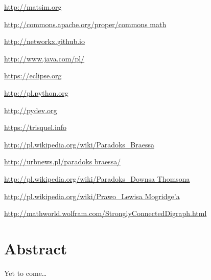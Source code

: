 \documentclass[twoside,12pt]{report}
\let\oldsection\chapter
\def\chapter{\cleardoublepage\oldsection}
\begin{document}
\begin{thebibliography}{99}
	\url{http://matsim.org}	

	\url{http://commons.apache.org/proper/commons math}
	
	\url{http://networkx.github.io}

	\url{http://www.java.com/pl/}

	\url{https://eclipse.org}
				
	\url{http://pl.python.org}
	
	\url{http://pydev.org}
	
	\url{https://trisquel.info}
			
	\url{http://pl.wikipedia.org/wiki/Paradoks_Braessa}
	
	\url{http://urbnews.pl/paradoks braessa/}
	
	\url{http://pl.wikipedia.org/wiki/Paradoks_Downsa Thomsona}
	
	\href{http://pl.wikipedia.org/wiki/Prawo_Lewisa Mogridge\%E2\%80\%99a}
	    {http://pl.wikipedia.org/wiki/Prawo\_Lewisa Mogridge\textquoteright{}a}
	   
	\url{http://mathworld.wolfram.com/StronglyConnectedDigraph.html}

\end{thebibliography}

\cleardoublepage
{}
{}
\chapter*{Abstract}


Yet to come\ldots{}
\end{document}
